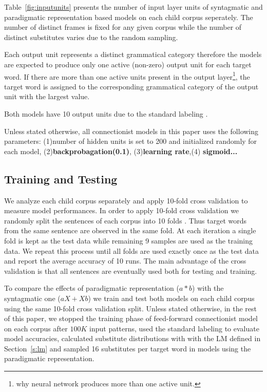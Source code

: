 Table~\ref{fig:inputunits} presents the number of input layer units of
syntagmatic and paradigmatic representation based models on each child
corpus seperately.  The number of distinct frames is fixed for any
given corpus while the number of distinct substitutes varies due to
the random sampling.

Each output unit represents a distinct grammatical category therefore the
models are expected to produce only one active (non-zero) output unit for each
target word.  If there are more than one active units present in the output
layer\footnote{why neural network produces more than one active unit.}, the
target word is assigned to the corresponding grammatical category of the output
unit with the largest value.

Both models have 10 output units due to the standard labeling
\citep*{Mintz200391}.

Unless stated otherwise, all connectionist models in this paper uses the
following parameters: (1)number of hidden units is set to 200 and initialized
randomly for each model, (2){\bf backprobagation(0.1)}, (3){\bf learning
rate},(4) {\bf sigmoid...}

\subsection{Training and Testing}


We analyze each child corpus separately and apply 10-fold cross validation to
measure model performances.  In order to apply 10-fold cross validation we
randomly split the sentences of each corpus into 10 folds .  Thus target words
from the same sentence are observed in the same fold.  At each iteration a
single fold is kept as the test data while remaining 9 samples are used as the
training data.  We repeat this process until all folds are used exactly once as
the test data and report the average accuracy of 10 runs.  The main advantage
of the cross validation is that all sentences are eventually used both for
testing and training.

To compare the effects of paradigmatic representation ($a*b$) with the
syntagmatic one ($aX+Xb$) we train and test both models on each child corpus
using the same 10-fold cross validation split.  Unless stated otherwise, in the
rest of this paper, we stopped the training phase of feed-forward connectionist
model on each corpus after $100K$ input patterns, used the standard labeling to
evaluate model accuracies, calculated substitute distributions with with the LM
defined in Section~\ref{s:lm} and sampled 16 substitutes per target word in
models using the paradigmatic representation.

